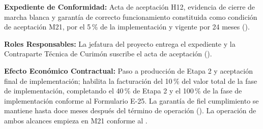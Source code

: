 \par\noindent\textbf{Expediente de Conformidad:} Acta de aceptación H12, evidencia de cierre de marcha blanca y garantía de correcto funcionamiento constituida como condición de aceptación M21, por el 5\,\% de la implementación y vigente por 24 meses ().\par
\par\noindent\textbf{Roles Responsables:} La jefatura del proyecto entrega el expediente y la Contraparte Técnica de Curimón suscribe el acta de aceptación ().\par
\par\noindent\textbf{Efecto Económico Contractual:} Paso a producción de Etapa 2 y aceptación final de implementación; habilita la facturación del 10\,\% del valor total de la fase de implementación, completando el 40\,\% de Etapa 2 y el 100\,\% de la fase de implementación conforme al Formulario E-25. La garantía de fiel cumplimiento se mantiene hasta doce meses después del término de operación (). La operación de ambos alcances empieza en M21 conforme al .\par

